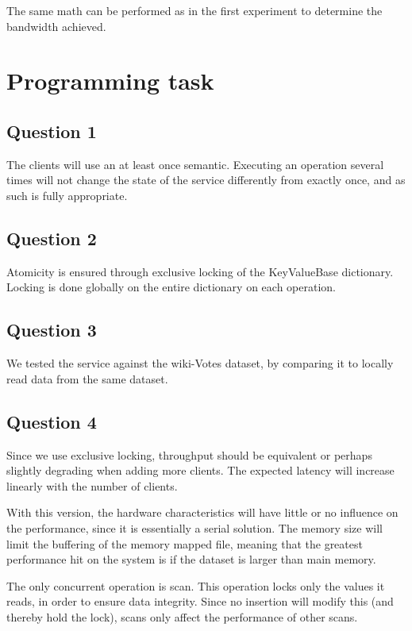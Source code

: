 \documentclass[11pt,a4paper]{article}
\begin{document}
The same math can be performed as in the first experiment to determine the
bandwidth achieved.

\section{Programming task}

\subsection{Question 1}
The clients will use an at least once semantic. Executing an operation
several times will not change the state of the service differently from
exactly once, and as such is fully appropriate.

\subsection{Question 2}
Atomicity is ensured through exclusive locking of the KeyValueBase dictionary.
Locking is done globally on the entire dictionary on each operation.

\subsection{Question 3}
We tested the service against the wiki-Votes dataset,
by comparing it to locally read data from the same dataset.


\subsection{Question 4}
Since we use exclusive locking, throughput should be equivalent or perhaps slightly degrading
when adding more clients. The expected latency will increase linearly with the number of
clients.

With this version, the hardware characteristics will have little or no influence on the
performance, since it is essentially a serial solution. The memory size will limit the
buffering of the memory mapped file, meaning that the greatest performance hit
on the system is if the dataset is larger than main memory.

The only concurrent operation is scan. This operation locks only the values it
reads, in order to ensure data integrity. Since no insertion will modify this
(and thereby hold the lock), scans only affect the performance of other scans.
\end{document}
